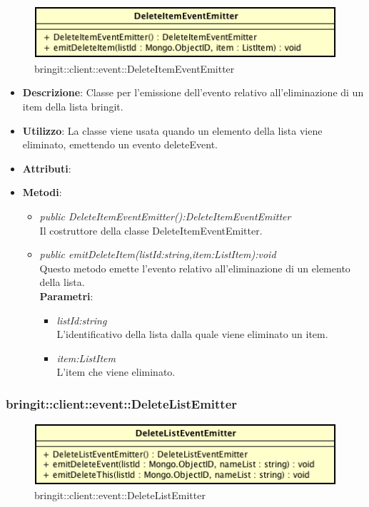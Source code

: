 \label{bringit::client::event::DeleteItemEventEmitter}
\begin{figure}[H]
	\centering
	\includegraphics[scale=0.5]{Sezioni/SottosezioniST/img/app/DeleteItemEventEmitter.png}
	\caption{bringit::client::event::DeleteItemEventEmitter}
\end{figure}

\begin{itemize}
\item \textbf{Descrizione}: Classe per l'emissione dell'evento relativo all'eliminazione di un item della lista bringit.
\item \textbf{Utilizzo}: La classe viene usata quando un elemento della lista viene eliminato, emettendo un evento deleteEvent.
\item \textbf{Attributi}: 
\item \textbf{Metodi}:
	\begin{itemize}
	\item \textit{public DeleteItemEventEmitter():DeleteItemEventEmitter}\\
	Il costruttore della classe DeleteItemEventEmitter. 
	\item \textit{public emitDeleteItem(listId:string,item:ListItem):void}\\
	Questo metodo emette l'evento relativo all'eliminazione di un elemento della lista.
					\\ \textbf{Parametri}: \begin{itemize}
			\item \textit{listId:string}\\
			L'identificativo della lista dalla quale viene eliminato un item.
			\item \textit{item:ListItem}\\
			L'item che viene eliminato.
					\end{itemize}
	\end{itemize}
\end{itemize}


\subsubsection{bringit::client::event::DeleteListEmitter}

\label{bringit::client::event::DeleteListEmitter}
\begin{figure}[H]
	\centering
	\includegraphics[scale=0.5]{Sezioni/SottosezioniST/img/app/DeleteListEmitter.png}
	\caption{bringit::client::event::DeleteListEmitter}
\end{figure}

